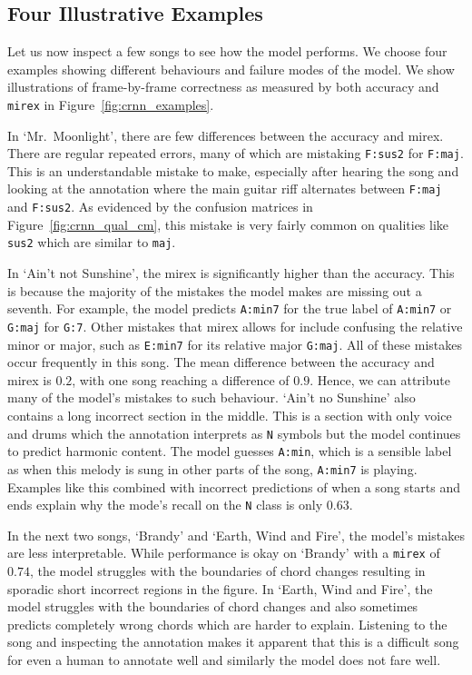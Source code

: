 \subsection{Four Illustrative Examples}\label{sec:crnn_examples}

Let us now inspect a few songs to see how the model performs. We choose four examples showing different behaviours and failure modes of the model. We show illustrations of frame-by-frame correctness as measured by both accuracy and \texttt{mirex} in Figure~\ref{fig:crnn_examples}. 

In `Mr.\ Moonlight', there are few differences between the accuracy and mirex. There are regular repeated errors, many of which are mistaking \texttt{F:sus2} for \texttt{F:maj}. This is an understandable mistake to make, especially after hearing the song and looking at the annotation where the main guitar riff alternates between \texttt{F:maj} and \texttt{F:sus2}. As evidenced by the confusion matrices in Figure~\ref{fig:crnn_qual_cm}, this mistake is very fairly common on qualities like \texttt{sus2} which are similar to \texttt{maj}. 

In `Ain't not Sunshine', the mirex is significantly higher than the accuracy. This is because the majority of the mistakes the model makes are missing out a seventh. For example, the model predicts \texttt{A:min7} for the true label of \texttt{A:min7} or \texttt{G:maj} for \texttt{G:7}. Other mistakes that mirex allows for include confusing the relative minor or major, such as \texttt{E:min7} for its relative major \texttt{G:maj}. All of these mistakes occur frequently in this song. The mean difference between the accuracy and mirex is $0.2$, with one song reaching a difference of $0.9$. Hence, we can attribute many of the model's mistakes to such behaviour. `Ain't no Sunshine' also contains a long incorrect section in the middle. This is a section with only voice and drums which the annotation interprets as \texttt{N} symbols but the model continues to predict harmonic content. The model guesses \texttt{A:min}, which is a sensible label as when this melody is sung in other parts of the song, \texttt{A:min7} is playing. Examples like this combined with incorrect predictions of when a song starts and ends explain why the mode's recall on the \texttt{N} class is only $0.63$.

In the next two songs, `Brandy' and `Earth, Wind and Fire', the model's mistakes are less interpretable. While performance is okay on `Brandy' with a \texttt{mirex} of $0.74$, the model struggles with the boundaries of chord changes resulting in sporadic short incorrect regions in the figure. In `Earth, Wind and Fire', the model struggles with the boundaries of chord changes and also sometimes predicts completely wrong chords which are harder to explain. Listening to the song and inspecting the annotation makes it apparent that this is a difficult song for even a human to annotate well and similarly the model does not fare well.

